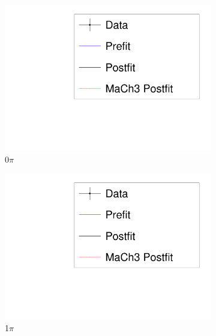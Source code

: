 \begin{figure}
	\begin{subfigure}[t]{0.32\textwidth}
		\includegraphics[width=\textwidth, trim={5mm 3mm 15mm 10mm}, clip, page=9]{figures/mach3/banff/mach3banff_mom}
		\caption{0$\pi$}
	\end{subfigure}
	\begin{subfigure}[t]{0.32\textwidth}
		\includegraphics[width=\textwidth, trim={5mm 3mm 15mm 10mm}, clip, page=10]{figures/mach3/banff/mach3banff_mom}
		\caption{1$\pi$}
	\end{subfigure}
	\begin{subfigure}[t]{0.32\textwidth}

\end{subfigure}
\end{figure}
